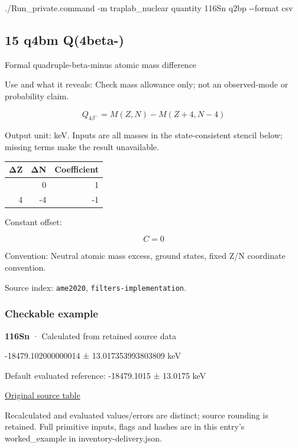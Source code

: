 \documentclass[
  11pt,
  letterpaper,
]{article}
\newenvironment{Shaded}{}{}
\newcommand{\AttributeTok}[1]{\textcolor[rgb]{0.49,0.56,0.16}{#1}}
\newcommand{\ExtensionTok}[1]{#1}
\newcommand{\NormalTok}[1]{#1}
\begin{document}
\begin{Shaded}
\begin{Highlighting}[]
\ExtensionTok{./Run\_private.command} \AttributeTok{{-}m}\NormalTok{ traplab\_nuclear quantity 116Sn q2bp }\AttributeTok{{-}{-}format}\NormalTok{ csv}
\end{Highlighting}
\end{Shaded}

\subsection{15 q4bm Q(4beta-)}\label{q4bm-q4beta-}

Formal quadruple-beta-minus atomic mass difference

Use and what it reveals: Check mass allowance only; not an observed-mode
or probability claim.

\[
Q_{4\beta^-}=M(Z,N)-M(Z+4,N-4)
\]

Output unit: keV. Inputs are all masses in the state-consistent stencil
below; missing terms make the result unavailable.

\begin{longtable}[]{@{}rrr@{}}
\toprule\noalign{}
ΔZ & ΔN & Coefficient \\
\midrule\noalign{}
\endhead
\bottomrule\noalign{}
\endlastfoot
0 & 0 & 1 \\
4 & -4 & -1 \\
\end{longtable}

Constant offset:

\[
C=0
\]

Convention: Neutral atomic mass excess, ground states, fixed Z/N
coordinate convention.

Source index: \texttt{ame2020}, \texttt{filters-implementation}.

\subsubsection{Checkable example}\label{checkable-example-14}

\textbf{116Sn} · Calculated from retained source data

-18479.102000000014 ± 13.017353993803809 keV

Default evaluated reference: -18479.1015 ± 13.0175 keV

\href{https://www-nds.iaea.org/amdc/ame2020/rct2_1.mas20.txt}{Original
source table}

Recalculated and evaluated values/errors are distinct; source rounding
is retained. Full primitive inputs, flags and hashes are in this entry's
worked\_example in inventory-delivery.json.
\end{document}
